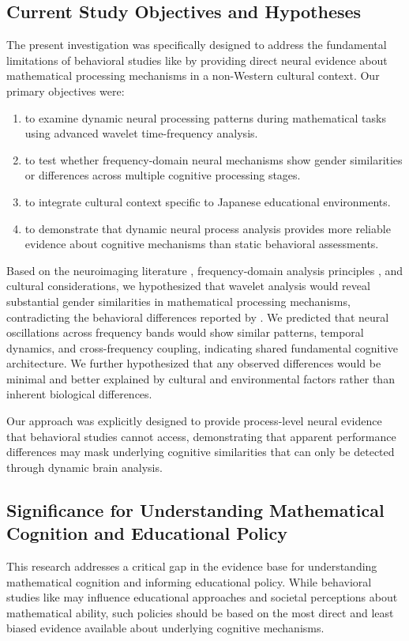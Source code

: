 \documentclass[pdflatex,reference]{sn-jnl}%
\theoremstyle{thmstyleone}%
\theoremstyle{thmstyletwo}%
\theoremstyle{thmstylethree}%
\begin{document}
\subsection{Current Study Objectives and Hypotheses}
The present investigation was specifically designed to address the fundamental limitations of behavioral studies like \cite{martinot2025mathematical} by providing direct neural evidence about mathematical processing mechanisms in a non-Western cultural context. Our primary objectives were: 
\begin{enumerate}
\item to examine dynamic neural processing patterns during mathematical tasks using advanced wavelet time-frequency analysis.
\item to test whether frequency-domain neural mechanisms show gender similarities or differences across multiple cognitive processing stages.
\item to integrate cultural context specific to Japanese educational environments.
\item to demonstrate that dynamic neural process analysis provides more reliable evidence about cognitive mechanisms than static behavioral assessments.
\end{enumerate}

Based on the neuroimaging literature \cite{dehaene2003three,ansari2019mathematical}, frequency-domain analysis principles \cite{buzsaki2006rhythms,fries2005mechanism}, and cultural considerations, we hypothesized that wavelet analysis would reveal substantial gender similarities in mathematical processing mechanisms, contradicting the behavioral differences reported by \cite{martinot2025mathematical}. We predicted that neural oscillations across frequency bands would show similar patterns, temporal dynamics, and cross-frequency coupling, indicating shared fundamental cognitive architecture. We further hypothesized that any observed differences would be minimal and better explained by cultural and environmental factors rather than inherent biological differences.

Our approach was explicitly designed to provide process-level neural evidence that behavioral studies cannot access, demonstrating that apparent performance differences may mask underlying cognitive similarities that can only be detected through dynamic brain analysis.


\subsection{Significance for Understanding Mathematical Cognition and Educational Policy}
This research addresses a critical gap in the evidence base for understanding mathematical cognition and informing educational policy. While behavioral studies like \cite{martinot2025mathematical} may influence educational approaches and societal perceptions about mathematical ability, such policies should be based on the most direct and least biased evidence available about underlying cognitive mechanisms.
\end{document}
